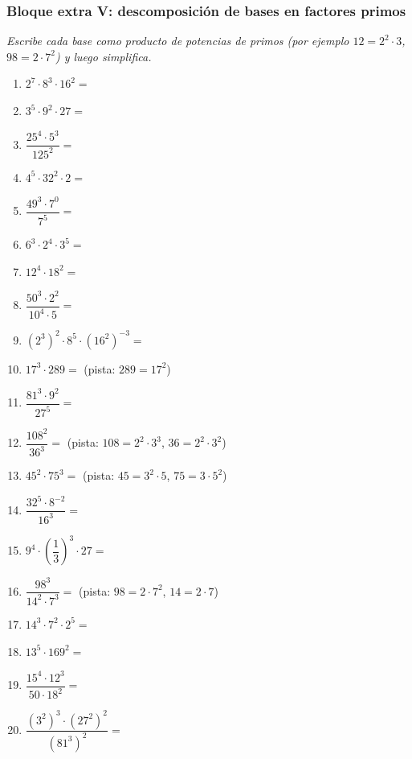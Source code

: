 \documentclass[12pt, letterpaper]{article}
\begin{document}
\subsubsection*{Bloque extra V: descomposición de bases en factores primos}
\textit{Escribe cada base como producto de potencias de primos (por ejemplo $12 = 2^2 \cdot 3$, $98 = 2 \cdot 7^2$) y luego simplifica.}

\begin{enumerate}[leftmargin=*, start=102]
  \item \medio{} $2^7 \cdot 8^3 \cdot 16^2 =$

  \item \medio{} $3^5 \cdot 9^2 \cdot 27 =$

  \item \medio{} $\dfrac{25^4 \cdot 5^3}{125^2} =$

  \item \medio{} $4^5 \cdot 32^2 \cdot 2 =$

  \item \medio{} $\dfrac{49^3 \cdot 7^0}{7^5} =$

  \item \dificil{} $6^3 \cdot 2^4 \cdot 3^5 =$

  \item \dificil{} $12^4 \cdot 18^2 =$

  \item \dificil{} $\dfrac{50^3 \cdot 2^2}{10^4 \cdot 5} =$

  \item \dificil{} $(2^3)^2 \cdot 8^5 \cdot (16^2)^{-3} =$

  \item \medio{} $17^3 \cdot 289 =$ \quad (pista: $289 = 17^2$)

  \item \dificil{} $\dfrac{81^3 \cdot 9^2}{27^5} =$

  \item \dificil{} $\dfrac{108^2}{36^3} =$ \quad (pista: $108 = 2^2 \cdot 3^3$, $36 = 2^2 \cdot 3^2$)

  \item \dificil{} $45^2 \cdot 75^3 =$ \quad (pista: $45 = 3^2 \cdot 5$, $75 = 3 \cdot 5^2$)

  \item \dificil{} $\dfrac{32^5 \cdot 8^{-2}}{16^3} =$

  \item \dificil{} $9^4 \cdot \left(\dfrac{1}{3}\right)^3 \cdot 27 =$

  \item \dificil{} $\dfrac{98^3}{14^2 \cdot 7^3} =$ \quad (pista: $98 = 2 \cdot 7^2$, $14 = 2 \cdot 7$)

  \item \dificil{} $14^3 \cdot 7^2 \cdot 2^5 =$

  \item \medio{} $13^5 \cdot 169^2 =$

  \item \dificil{} $\dfrac{15^4 \cdot 12^3}{50 \cdot 18^2} =$

  \item \muyDificil{} $\dfrac{(3^2)^3 \cdot (27^2)^2}{(81^3)^2} =$
\end{enumerate}
\end{document}
